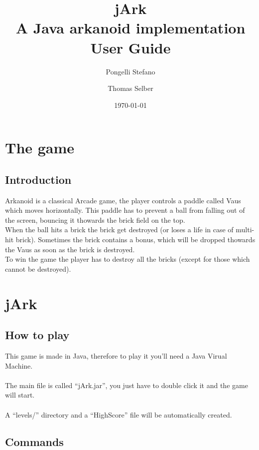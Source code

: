 \documentclass[12pt]{article}
\begin{document}
\title{jArk \\\small A Java arkanoid implementation \\ User Guide }
\author{Pongelli Stefano \and Thomas Selber} 
\date{\today}
\maketitle
\newpage
\tableofcontents
\newpage
\section{The game}
\label{sec:go}

\subsection{Introduction}
\label{sec:intro}

Arkanoid is a classical Arcade game, the player controls a paddle called Vaus which moves horizontally. This paddle has to prevent a ball from falling out of the screen, bouncing it thowards the brick field on the top.\\
When the ball hits a brick the brick get destroyed (or loses a life in case of multi-hit brick). Sometimes the brick contains a bonus, which will be dropped thowards the Vaus as soon as the brick is destroyed.\\
To win the game the player has to destroy all the bricks (except for those which cannot be destroyed).

\newpage
\section{jArk}

\subsection{How to play}
This game is made in Java, therefore to play it you'll need a Java Virual Machine.\\\\
The main file is called ``jArk.jar'', you just have to double click it and the game will start.\\\\
A ``levels/'' directory and a ``HighScore'' file will be automatically created.\\

\subsection{Commands}
\label{sec:intro}
\end{document}
